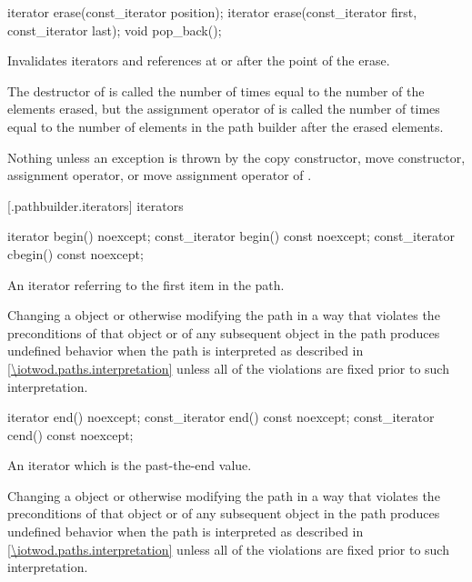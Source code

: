 %
%
\begin{itemdecl}
iterator erase(const_iterator position);
iterator erase(const_iterator first, const_iterator last);
void pop_back();
\end{itemdecl}

\begin{itemdescr}
\pnum
\effects
Invalidates iterators and references at or after the point of the erase.

\pnum
\complexity
The destructor of  is called the number of times equal to 
the number of the elements erased, but the assignment operator
of  is called the number of times equal to the number of
elements in the path builder after the erased elements.

\pnum
\throws
Nothing unless an exception is thrown by the copy constructor, move 
constructor, assignment operator, or move assignment operator of
.
\end{itemdescr}

 [\iotwod.pathbuilder.iterators] { iterators}

%
%
\begin{itemdecl}
iterator begin() noexcept;
const_iterator begin() const noexcept;
const_iterator cbegin() const noexcept;
\end{itemdecl}
\begin{itemdescr}
\pnum
\returns
An iterator referring to the first  item in the path.

\pnum
\remarks
Changing a  object or otherwise modifying the path in a way that violates the preconditions of that  object or of any subsequent  object in the path produces undefined behavior when the path is interpreted as described in \ref{\iotwod.paths.interpretation} unless all of the violations are fixed prior to such interpretation.
\end{itemdescr}

%
%
\begin{itemdecl}
iterator end() noexcept;
const_iterator end() const noexcept;
const_iterator cend() const noexcept;
\end{itemdecl}
\begin{itemdescr}
\pnum
\returns
An iterator which is the past-the-end value.

\pnum
\remarks
Changing a  object or otherwise modifying the path in a way that violates the preconditions of that  object or of any subsequent  object in the path produces undefined behavior when the path is interpreted as described in \ref{\iotwod.paths.interpretation} unless all of the violations are fixed prior to such interpretation.
\end{itemdescr}

